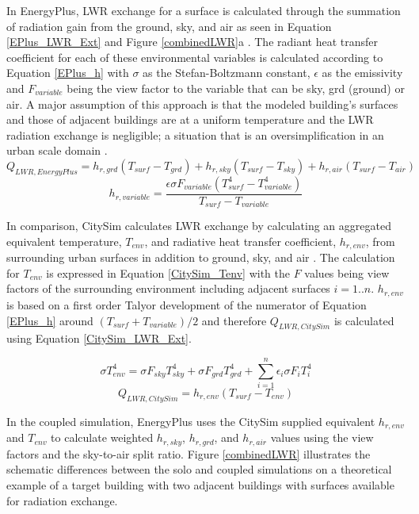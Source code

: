 \documentclass{tBPS2e}
\theoremstyle{plain}
\theoremstyle{definition}
\theoremstyle{remark}
\begin{document}
In EnergyPlus, LWR exchange for a surface is calculated through the summation
of radiation gain from the ground, sky, and air as seen in Equation
\ref{EPlus_LWR_Ext} and Figure \ref{combinedLWR}a \citep{doe2010energyplus}.
The radiant heat transfer coefficient for each of these environmental
variables is calculated according to Equation \ref{EPlus_h} with $\sigma$ as
the Stefan-Boltzmann constant, $\epsilon$ as the emissivity and $F_{variable}$ being the
view factor to the variable that can be sky, grd (ground) or air. A major
assumption of this approach is that the modeled building's surfaces and those
of adjacent buildings are at a uniform temperature and the LWR radiation
exchange is negligible; a situation that is an oversimplification in an urban
scale domain \citep{Evins:2014cf}.
\begin{equation} \label{EPlus_LWR_Ext} 
Q_{LWR,EnergyPlus} = h_{r,grd}(T_{surf}-T_{grd}) + h_{r,sky}(T_{surf}-T_{sky}) + h_{r,air}(T_{surf}-T_{air})
\end{equation}
\begin{equation} \label{EPlus_h} 
h_{r,variable} = \frac{\epsilon\sigma F_{variable}(T^{4}_{surf}-T^{4}_{variable})}{T_{surf}-T_{variable}}
\end{equation}

In comparison, CitySim calculates LWR exchange by calculating an aggregated
equivalent temperature, $T_{env}$, and radiative heat transfer coefficient,
$h_{r,env}$, from surrounding urban surfaces in addition to ground, sky, and
air \citep{Robinson:2009tm}. The calculation for $T_{env}$ is expressed in
Equation \ref{CitySim_Tenv} with the $F$ values being view factors of the
surrounding environment including adjacent surfaces $i=1..n$. $h_{r,env}$ is
based on a first order Talyor development of the numerator of Equation
\ref{EPlus_h} around $(T_{surf}+T_{variable})/2$ and therefore
$Q_{LWR,CitySim}$ is calculated using Equation \ref{CitySim_LWR_Ext}.

\begin{equation} \label{CitySim_Tenv} 
\sigma T_{env}^4 = \sigma F_{sky}T_{sky}^4 +\sigma F_{grd}T_{grd}^4 + \sum_{i=1}^{n} \epsilon_i \sigma F_{i}T_{i}^4
\end{equation}
\begin{equation} \label{CitySim_LWR_Ext} 
Q_{LWR,CitySim} = h_{r,env}(T_{surf}-T_{env})
\end{equation}

In the coupled simulation, EnergyPlus uses the CitySim supplied equivalent
$h_{r,env}$ and $T_{env}$ to calculate weighted $h_{r,sky}$, $h_{r,grd}$, and
$h_{r,air}$ values using the view factors and the sky-to-air split ratio.
Figure \ref{combinedLWR} illustrates the schematic differences between the
solo and coupled simulations on a theoretical example of a target building
with two adjacent buildings with surfaces available for radiation exchange.
\end{document}
